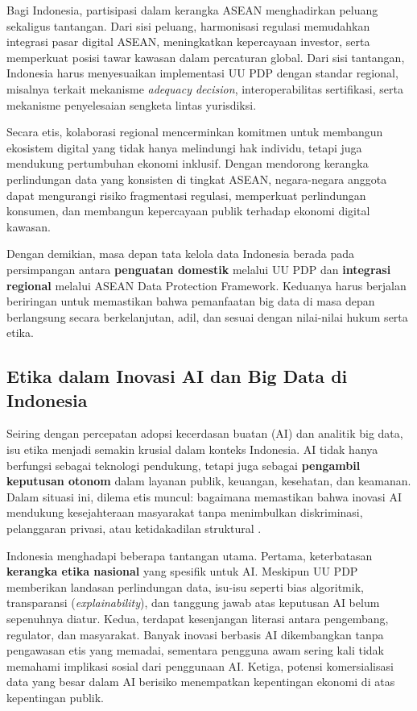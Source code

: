 Bagi Indonesia, partisipasi dalam kerangka ASEAN menghadirkan peluang sekaligus tantangan. Dari sisi peluang, harmonisasi regulasi memudahkan integrasi pasar digital ASEAN, meningkatkan kepercayaan investor, serta memperkuat posisi tawar kawasan dalam percaturan global. Dari sisi tantangan, Indonesia harus menyesuaikan implementasi UU PDP dengan standar regional, misalnya terkait mekanisme \textit{adequacy decision}, interoperabilitas sertifikasi, serta mekanisme penyelesaian sengketa lintas yurisdiksi.  

Secara etis, kolaborasi regional mencerminkan komitmen untuk membangun ekosistem digital yang tidak hanya melindungi hak individu, tetapi juga mendukung pertumbuhan ekonomi inklusif. Dengan mendorong kerangka perlindungan data yang konsisten di tingkat ASEAN, negara-negara anggota dapat mengurangi risiko fragmentasi regulasi, memperkuat perlindungan konsumen, dan membangun kepercayaan publik terhadap ekonomi digital kawasan.  

Dengan demikian, masa depan tata kelola data Indonesia berada pada persimpangan antara \textbf{penguatan domestik} melalui UU PDP dan \textbf{integrasi regional} melalui ASEAN Data Protection Framework. Keduanya harus berjalan beriringan untuk memastikan bahwa pemanfaatan big data di masa depan berlangsung secara berkelanjutan, adil, dan sesuai dengan nilai-nilai hukum serta etika.

\subsection{Etika dalam Inovasi AI dan Big Data di Indonesia}

Seiring dengan percepatan adopsi kecerdasan buatan (AI) dan analitik big data, isu etika menjadi semakin krusial dalam konteks Indonesia. AI tidak hanya berfungsi sebagai teknologi pendukung, tetapi juga sebagai \textbf{pengambil keputusan otonom} dalam layanan publik, keuangan, kesehatan, dan keamanan. Dalam situasi ini, dilema etis muncul: bagaimana memastikan bahwa inovasi AI mendukung kesejahteraan masyarakat tanpa menimbulkan diskriminasi, pelanggaran privasi, atau ketidakadilan struktural \cite{mittelstadt2016ethics}.  

Indonesia menghadapi beberapa tantangan utama. Pertama, keterbatasan \textbf{kerangka etika nasional} yang spesifik untuk AI. Meskipun UU PDP memberikan landasan perlindungan data, isu-isu seperti bias algoritmik, transparansi (\textit{explainability}), dan tanggung jawab atas keputusan AI belum sepenuhnya diatur. Kedua, terdapat kesenjangan literasi antara pengembang, regulator, dan masyarakat. Banyak inovasi berbasis AI dikembangkan tanpa pengawasan etis yang memadai, sementara pengguna awam sering kali tidak memahami implikasi sosial dari penggunaan AI. Ketiga, potensi komersialisasi data yang besar dalam AI berisiko menempatkan kepentingan ekonomi di atas kepentingan publik.  

